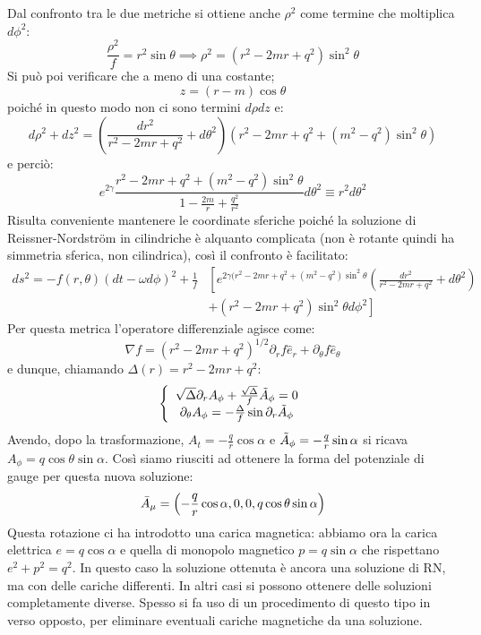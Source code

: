 Dal confronto tra le due metriche si ottiene anche $\rho^2$ come termine che moltiplica $d\phi^2$:
\begin{equation*}
    \frac{\rho^2}{f}=r^2\sin\theta \implies \rho^2 = (r^2 - 2mr + q^2)\sin^2\theta
\end{equation*}
Si può poi verificare che a meno di una costante;
\begin{equation*}
    z =(r-m)\cos\theta
\end{equation*}
poiché in questo modo non ci sono termini $d\rho dz $ e:
\begin{equation*}
    d\rho^2 + dz^2 = \left( \frac{dr^2}{r^2 -2mr + q^2} + d\theta^2\right)(r^2 -2mr + q^2 + (m^2-q^2)\sin^2\theta )
\end{equation*}
e perciò:
\begin{equation*}
    e^{2\gamma} \frac{r^2 -2mr +q^2 + (m^2-q^2)\sin^2\theta}{1 - \frac{2m}{r} + \frac{q^2}{r^2}}d\theta^2 \equiv r^2d\theta^2
\end{equation*}
Risulta conveniente mantenere le coordinate sferiche poiché la soluzione di Reissner-Nordstr\"om in cilindriche è alquanto complicata (non è rotante quindi ha simmetria sferica, non cilindrica), così il confronto è facilitato:
\begin{align*}
    ds^2 = -f(r,\theta)(dt - \omega d\phi)^2 + \frac{1}{f}&\left[ e^{2\gamma(r^2-2mr+q^2+ (m^2-q^2)\sin^2\theta}\left( \frac{dr^2}{r^2-2mr+q^2} + d\theta^2 \right)  \right. \\ &\left. + (r^2-2mr+q^2)\sin^2\theta d\phi^2 \right]
\end{align*}
Per questa metrica l'operatore differenziale agisce come:
\begin{equation*}
    \nabla f = (r^2 -2mr + q^2)^{1/2}\partial_r f\hat{e}_r
 + \partial_\theta f \hat{e}_\theta
 \end{equation*}
e dunque, chiamando $\Delta(r) = r^2 - 2mr + q^2$:
\begin{equation*}
    \left\{\begin{array}{c}
         \sqrt{\Delta}\partial_r A_\phi + \frac{\sqrt{\Delta}}{f}\Tilde{A}_\phi = 0 \\
         \partial_\theta A_\phi = - \frac{\Delta}{f}\sin \partial_r \Tilde{A}_\phi
    \end{array}\right.
\end{equation*}
Avendo, dopo la trasformazione, $A_t = - \frac{q}{r}\cos\alpha$ e $\Tilde{A}_\phi = -\frac{q}{r}\sin\alpha$ si ricava $A_\phi = q\cos\theta\sin\alpha$. Così siamo riusciti ad ottenere la forma del potenziale di gauge per questa nuova soluzione:
\begin{equation*}
    \Bar{A}_\mu = \left( - \frac{q}{r}\cos\alpha, 0,0, q\cos\theta\sin\alpha \right)
\end{equation*}
Questa rotazione ci ha introdotto una carica magnetica: abbiamo ora la carica elettrica $e = q\cos\alpha$ e quella di monopolo magnetico $p = q\sin\alpha$ che rispettano $e^2 + p^2 = q^2$. In questo caso la soluzione ottenuta è ancora una soluzione di RN, ma con delle cariche differenti. In altri casi si possono ottenere delle soluzioni completamente diverse. Spesso si fa uso di un procedimento di questo tipo in verso opposto, per eliminare eventuali cariche magnetiche da una soluzione.

